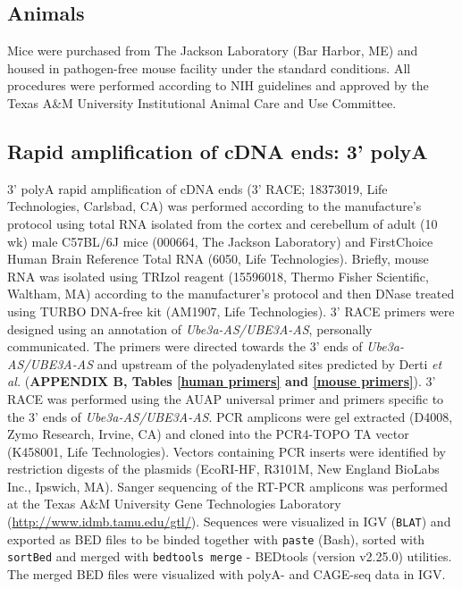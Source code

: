 \subsection{Animals}
Mice were purchased from The Jackson Laboratory (Bar Harbor, ME) and housed in pathogen-free mouse facility under the standard conditions. All procedures were performed according to NIH guidelines and approved by the Texas A\&M University Institutional Animal Care and Use Committee.

\subsection{Rapid amplification of cDNA ends: 3' polyA}
3' polyA rapid amplification of cDNA ends (3' RACE; 18373019, Life Technologies, Carlsbad, CA) was performed according to the manufacture's protocol using total RNA isolated from the cortex and cerebellum of adult (10 wk) male C57BL/6J mice (000664, The Jackson Laboratory) and FirstChoice Human Brain Reference Total RNA (6050, Life Technologies). Briefly, mouse RNA was isolated using TRIzol reagent (15596018, Thermo Fisher Scientific, Waltham, MA) according to the manufacturer’s protocol and then DNase treated using TURBO DNA-free kit (AM1907, Life Technologies). 3' RACE primers were designed using an annotation of \textit{Ube3a-AS/UBE3A-AS}, personally communicated. The primers were directed towards the 3' ends of \textit{Ube3a-AS/UBE3A-AS} and upstream of the polyadenylated sites predicted by Derti \textit{et al.} \cite{Derti2012} (\textbf{APPENDIX B, Tables \ref{human primers} and \ref{mouse primers}}). 3' RACE was performed using the AUAP universal primer and primers specific to the 3' ends of \textit{Ube3a-AS/UBE3A-AS}. PCR amplicons were gel extracted (D4008, Zymo Research, Irvine, CA) and cloned into the PCR4-TOPO TA vector (K458001, Life Technologies). Vectors containing PCR inserts were identified by restriction digests of the plasmids (EcoRI-HF, R3101M, New England BioLabs Inc., Ipswich, MA). Sanger sequencing of the RT-PCR amplicons was performed at the Texas A\&M University Gene Technologies Laboratory (\url{http://www.idmb.tamu.edu/gtl/}). Sequences were visualized in IGV (\texttt{BLAT}) and exported as BED files  to be binded together with \texttt{paste} (Bash), sorted with \texttt{sortBed} and merged with \texttt{bedtools merge} - BEDtools \cite{Quinlan2010} (version v2.25.0) utilities. The merged BED files were visualized with polyA- and CAGE-seq data in IGV.

